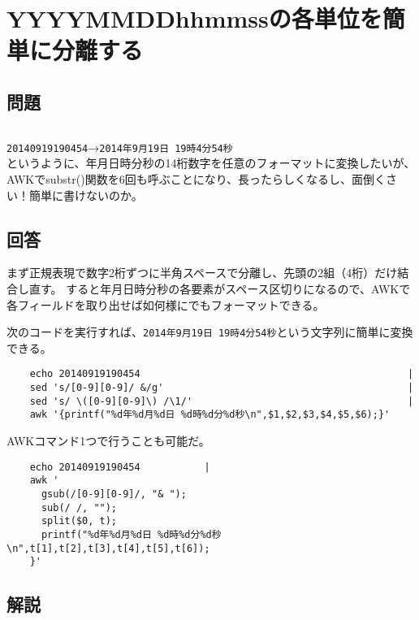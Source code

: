 \section{YYYYMMDDhhmmssの各単位を簡単に分離する}

\subsection*{問題}
\noindent
$\!\!\!\!\!$
\begin{grshfboxit}{160.0mm}
	\verb|20140919190454|→\verb|2014年9月19日 19時4分54秒| \\
	というように、年月日時分秒の14桁数字を任意のフォーマットに変換したいが、
	AWKでsubstr()関数を6回も呼ぶことになり、長ったらしくなるし、面倒くさい！簡単に書けないのか。
\end{grshfboxit}

\subsection*{回答}
まず正規表現で数字2桁ずつに半角スペースで分離し、先頭の2組（4桁）だけ結合し直す。
すると年月日時分秒の各要素がスペース区切りになるので、AWKで各フィールドを取り出せば如何様にでもフォーマットできる。

次のコードを実行すれば、\verb|2014年9月19日 19時4分54秒|という文字列に簡単に変換できる。\\
\begin{frameboxit}{160.0mm}
\begin{verbatim}
	echo 20140919190454                                              |
	sed 's/[0-9][0-9]/ &/g'                                          |
	sed 's/ \([0-9][0-9]\) /\1/'                                     |
	awk '{printf("%d年%d月%d日 %d時%d分%d秒\n",$1,$2,$3,$4,$5,$6);}'
\end{verbatim}
\end{frameboxit}

AWKコマンド1つで行うことも可能だ。\\
\begin{frameboxit}{160.0mm}
\begin{verbatim}
	echo 20140919190454           |
	awk '
	  gsub(/[0-9][0-9]/, "& ");
	  sub(/ /, "");
	  split($0, t);
	  printf("%d年%d月%d日 %d時%d分%d秒\n",t[1],t[2],t[3],t[4],t[5],t[6]);
	}'
\end{verbatim}
\end{frameboxit}

\subsection*{解説}

